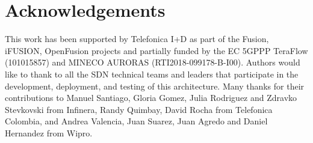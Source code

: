 \documentclass[10pt, conference]{IEEEtran}
\begin{document}

\section*{Acknowledgements}
This  work has been supported by Telefonica I+D as part of the Fusion, i\uppercase{FUSION}, OpenFusion projects and partially funded by the EC 5GPPP TeraFlow (101015857) and MINECO AURORAS (RTI2018-099178-B-I00). Authors would like to thank to all the SDN technical teams and leaders that participate in the development, deployment, and testing of this  architecture. Many thanks for their contributions to Manuel Santiago, Gloria Gomez, Julia Rodriguez and Zdravko Stevkovski from Infinera, Randy Quimbay, David Rocha from Telefonica Colombia, and Andrea Valencia, Juan Suarez, Juan Agredo and Daniel Hernandez from Wipro.   

%


\end{document}
